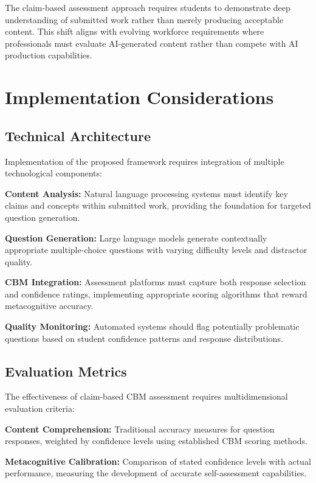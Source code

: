 \documentclass[sigconf]{acmart}
\begin{document}
The claim-based assessment approach requires students to demonstrate deep understanding of submitted work rather than merely producing acceptable content. This shift aligns with evolving workforce requirements where professionals must evaluate AI-generated content rather than compete with AI production capabilities.

\section{Implementation Considerations}

\subsection{Technical Architecture}

Implementation of the proposed framework requires integration of multiple technological components:

\textbf{Content Analysis:} Natural language processing systems must identify key claims and concepts within submitted work, providing the foundation for targeted question generation.

\textbf{Question Generation:} Large language models generate contextually appropriate multiple-choice questions with varying difficulty levels and distractor quality.

\textbf{CBM Integration:} Assessment platforms must capture both response selection and confidence ratings, implementing appropriate scoring algorithms that reward metacognitive accuracy.

\textbf{Quality Monitoring:} Automated systems should flag potentially problematic questions based on student confidence patterns and response distributions.

\subsection{Evaluation Metrics}

The effectiveness of claim-based CBM assessment requires multidimensional evaluation criteria:

\textbf{Content Comprehension:} Traditional accuracy measures for question responses, weighted by confidence levels using established CBM scoring methods.

\textbf{Metacognitive Calibration:} Comparison of stated confidence levels with actual performance, measuring the development of accurate self-assessment capabilities.
\end{document}
